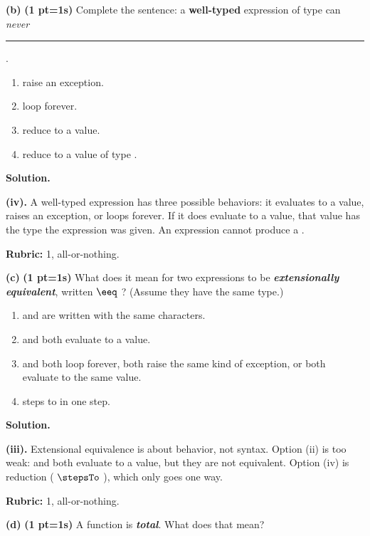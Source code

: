 \documentclass[crop=false]{standalone}
\newif\ifsol
\newenvironment{solution}
    {\par\color{solution_color}\begin{framed}\textbf{Solution.}\par}
    {\end{framed}}
\newcommand{\term}[1]{\textbf{\textit{#1}}}
\newcommand{\subpts}[1]{\textbf{(#1 pt\ifnum#1=1\else s\fi)}}
\newcommand{\answerspace}[1]{\ifsol\else\vspace{#1}\par\fi}
\begin{document}
\textbf{(b)} \subpts{1} Complete the sentence: a \textbf{well-typed}
expression of type  can \emph{never} \rule{4cm}{0.4pt}.

\begin{enumerate}[label=(\roman*)]
  \item raise an exception.
  \item loop forever.
  \item reduce to a value.
  \item reduce to a value of type .
\end{enumerate}

\answerspace{0.25cm}

\begin{solution}
\textbf{(iv).} A well-typed expression has three possible behaviors:
it evaluates to a value, raises an exception, or loops forever. If it
does evaluate to a value, that value has the type the expression was
given. An  expression cannot produce a .

\textbf{Rubric:} 1, all-or-nothing.
\end{solution}

\textbf{(c)} \subpts{1} What does it mean for two expressions to be
\term{extensionally equivalent}, written  $\eeq$ ?
(Assume they have the same type.)

\begin{enumerate}[label=(\roman*)]
  \item {} and  are written with the same characters.
  \item {} and  both evaluate to a value.
  \item {} and  both loop forever, both raise the same
    kind of exception, or both evaluate to the same value.
  \item {} steps to  in one step.
\end{enumerate}

\answerspace{0.25cm}

\begin{solution}
\textbf{(iii).} Extensional equivalence is about behavior, not syntax.
Option (ii) is too weak:  and  both evaluate to a value,
but they are not equivalent. Option (iv) is reduction (
$\stepsTo$ ), which only goes one way.

\textbf{Rubric:} 1, all-or-nothing.
\end{solution}

\textbf{(d)} \subpts{1} A function  is
\term{total}. What does that mean?
\end{document}
